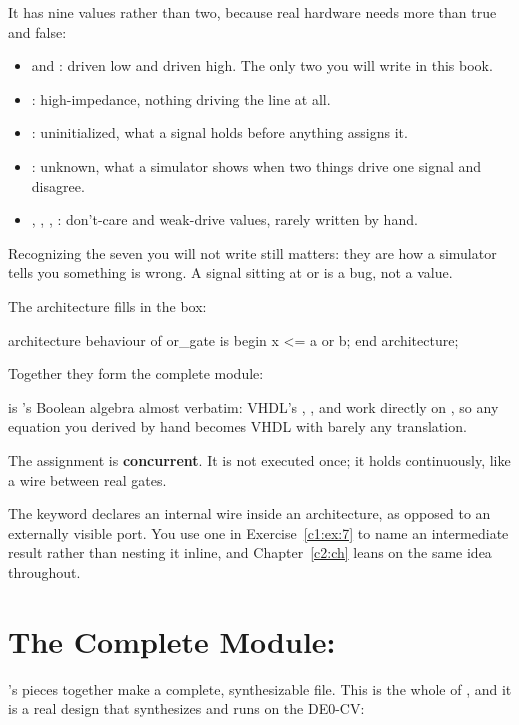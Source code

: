 \noindent It has nine values rather than two, because real hardware needs more than true and false:
\begin{itemize}
  \item {} and : driven low and driven high. The only two you will write in this
    book.
  \item {}: high-impedance, nothing driving the line at all.
  \item {}: uninitialized, what a signal holds before anything assigns it.
  \item {}: unknown, what a simulator shows when two things drive one signal and disagree.
  \item {}, , , : don't-care and weak-drive values, rarely
    written by hand.
\end{itemize}
Recognizing the seven you will not write still matters: they are how a simulator tells you
something is wrong. A signal sitting at  or  is a bug, not a value.

The architecture fills in the box:

\begin{vhdlcode}
architecture behaviour of or_gate is
begin
    x <= a or b;
end architecture;
\end{vhdlcode}


\noindent Together they form the complete module:


\noindent{} is 's Boolean algebra almost verbatim: VHDL's
, ,  and  work directly on , so any equation
you derived by hand becomes VHDL with barely any translation.

The assignment is \textbf{concurrent}. It is not executed once; it holds continuously, like a wire
between real gates.

The keyword  declares an internal wire inside an architecture, as opposed to an
externally visible port. You use one in Exercise~\ref{c1:ex:7} to name an intermediate result
rather than nesting it inline, and Chapter~\ref{c2:ch} leans on the same idea throughout.

\section{The Complete Module: }
\label{c1:a5}
's pieces together make a complete, synthesizable file. This is the whole of
, and it is a real design that synthesizes and runs on the
DE0-CV:


